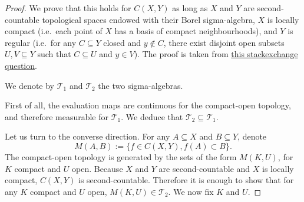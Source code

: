 \begin{proof}\leanok
We prove that this holds for $C(X, Y)$ as long as $X$ and $Y$ are second-countable topological spaces endowed with their Borel sigma-algebra, $X$ is locally compact (i.e.\ each point of $X$ has a basis of compact neighbourhoods), and $Y$ is regular (i.e.\ for any $C \subseteq Y$ closed and $y \notin C$, there exist disjoint open subsets $U, V \subseteq Y$ such that $C \subseteq U$ and $y \in V$). The proof is taken from \href{https://math.stackexchange.com/questions/4789531/when-does-the-borel-sigma-algebra-of-compact-convergence-coincide-with-the-pr}{this stackexchange question}.

We denote by $\mathcal{T}_1$ and $\mathcal{T}_2$ the two sigma-algebras.

First of all, the evaluation maps are continuous for the compact-open topology, and therefore measurable for $\mathcal{T}_1$. We deduce that $\mathcal{T}_2 \subseteq \mathcal{T}_1$.

Let us turn to the converse direction. For any $A \subseteq X$ and $B \subseteq Y$, denote
$$M(A, B) := \{f \in C(X, Y), f(A) \subset B\}.$$
The compact-open topology is generated by the sets of the form $M(K, U)$, for $K$ compact and $U$ open. Because $X$ and $Y$ are second-countable and $X$ is locally compact, $C(X, Y)$ is second-countable. Therefore it is enough to show that for any $K$ compact and $U$ open, $M(K, U) \in \mathcal{T}_2$. We now fix $K$ and $U$.


\end{proof}
